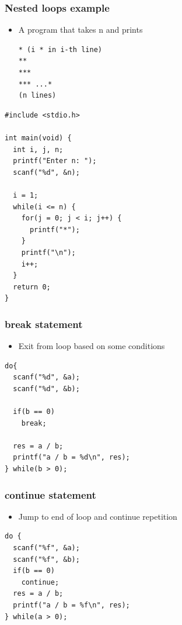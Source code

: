 \documentclass{../c-lecture}
\begin{document}
\begin{frame}[fragile]
  \frametitle{Nested loops example}
  \begin{itemize}
    \item A program that takes n and prints
    \begin{verbatim}
* (i * in i-th line)
**
***
*** ...*
(n lines)
    \end{verbatim}
  \end{itemize}
\end{frame}

\begin{frame}[fragile]
  \begin{verbatim}
#include <stdio.h>

int main(void) {
  int i, j, n;
  printf("Enter n: ");
  scanf("%d", &n);

  i = 1;
  while(i <= n) {
    for(j = 0; j < i; j++) {
      printf("*");
    }
    printf("\n");
    i++;
  }
  return 0;
}
  \end{verbatim}
\end{frame}

\begin{frame}[fragile]
  \frametitle{break statement}
  \begin{itemize}
    \item Exit from loop based on some conditions
  \end{itemize}
  \begin{verbatim}
do{
  scanf("%d", &a);
  scanf("%d", &b);

  if(b == 0)
    break;

  res = a / b;
  printf("a / b = %d\n", res);
} while(b > 0);
  \end{verbatim}
\end{frame}

\begin{frame}[fragile]
  \frametitle{continue statement}
  \begin{itemize}
    \item Jump to end of loop and continue repetition
  \end{itemize}
  \begin{verbatim}
do {
  scanf("%f", &a);
  scanf("%f", &b);
  if(b == 0)
    continue;
  res = a / b;
  printf("a / b = %f\n", res);
} while(a > 0);
  \end{verbatim}
\end{frame}
\end{document}
